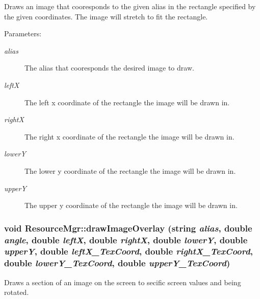Draws an image that cooresponds to the given alias in the rectangle specified by the given coordinates. The image will stretch to fit the rectangle. \begin{Desc}
\item[Parameters:]
\begin{description}
\item[{\em alias}]The alias that cooresponds the desired image to draw. \item[{\em leftX}]The left x coordinate of the rectangle the image will be drawn in. \item[{\em rightX}]The right x coordinate of the rectangle the image will be drawn in. \item[{\em lowerY}]The lower y coordinate of the rectangle the image will be drawn in. \item[{\em upperY}]The upper y coordinate of the rectangle the image will be drawn in. \end{description}
\end{Desc}
\hypertarget{class_resource_mgr_e6490546240c374d9886751f2f4cba80}{
\subsubsection[{drawImageOverlay}]{\setlength{\rightskip}{0pt plus 5cm}void ResourceMgr::drawImageOverlay (string {\em alias}, \/  double {\em angle}, \/  double {\em leftX}, \/  double {\em rightX}, \/  double {\em lowerY}, \/  double {\em upperY}, \/  double {\em leftX\_\-TexCoord}, \/  double {\em rightX\_\-TexCoord}, \/  double {\em lowerY\_\-TexCoord}, \/  double {\em upperY\_\-TexCoord})}}
\label{class_resource_mgr_e6490546240c374d9886751f2f4cba80}


Draws a section of an image on the screen to secific screen values and being rotated. 

